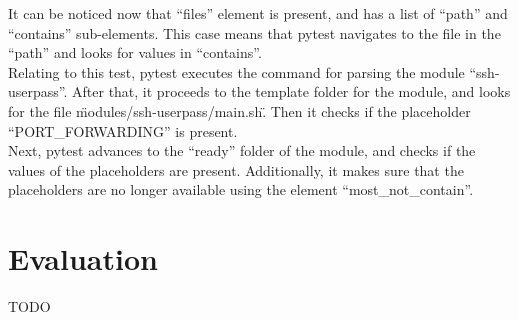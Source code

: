 It can be noticed now that “files” element is present, and has a list of “path” and “contains” sub-elements. This case means that pytest navigates to the file in the “path” and looks for values in “contains”.\\
Relating to this test, pytest executes the command for parsing the module “ssh-userpass”. After that, it proceeds to the template folder for the module, and looks for the file \"modules/ssh-userpass/main.sh\". Then it checks if the placeholder “PORT\_FORWARDING” is present.\\
Next, pytest advances to the “ready” folder of the module, and checks if the values of the placeholders are present. Additionally, it makes sure that the placeholders are no longer available using the element “most\_not\_contain”.\\


\section{Evaluation}
TODO
